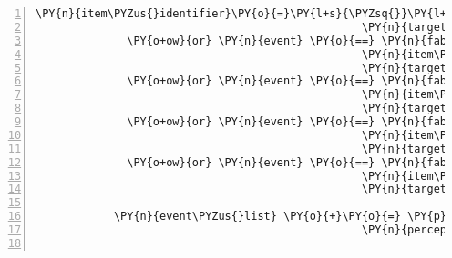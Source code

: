 \begin{Verbatim}[commandchars=\\\{\},numbers=left,firstnumber=1,stepnumber=1]
                                                  \PY{n}{item\PYZus{}identifier}\PY{o}{=}\PY{l+s}{\PYZsq{}}\PY{l+s}{lute\PYZus{}broken}\PY{l+s}{\PYZsq{}}\PY{p}{,}
                                                  \PY{n}{target\PYZus{}identifier}\PY{o}{=}\PY{l+s}{\PYZsq{}}\PY{l+s}{teleport\PYZus{}room\PYZus{}kuni}\PY{l+s}{\PYZsq{}}\PY{p}{)}
              \PY{o+ow}{or} \PY{n}{event} \PY{o}{==} \PY{n}{fabula}\PY{o}{.}\PY{n}{TriesToDropEvent}\PY{p}{(}\PY{n}{identifier}\PY{o}{=}\PY{n}{ID\PYZus{}CASSANDRA}\PY{p}{,}
                                                  \PY{n}{item\PYZus{}identifier}\PY{o}{=}\PY{l+s}{\PYZsq{}}\PY{l+s}{lute\PYZus{}broken}\PY{l+s}{\PYZsq{}}\PY{p}{,}
                                                  \PY{n}{target\PYZus{}identifier}\PY{o}{=}\PY{l+s}{\PYZsq{}}\PY{l+s}{teleport\PYZus{}room\PYZus{}cassandra}\PY{l+s}{\PYZsq{}}\PY{p}{)}
              \PY{o+ow}{or} \PY{n}{event} \PY{o}{==} \PY{n}{fabula}\PY{o}{.}\PY{n}{TriesToDropEvent}\PY{p}{(}\PY{n}{identifier}\PY{o}{=}\PY{n}{ID\PYZus{}CASSANDRA}\PY{p}{,}
                                                  \PY{n}{item\PYZus{}identifier}\PY{o}{=}\PY{l+s}{\PYZsq{}}\PY{l+s}{lute\PYZus{}broken}\PY{l+s}{\PYZsq{}}\PY{p}{,}
                                                  \PY{n}{target\PYZus{}identifier}\PY{o}{=}\PY{l+s}{\PYZsq{}}\PY{l+s}{teleport\PYZus{}room\PYZus{}kuni}\PY{l+s}{\PYZsq{}}\PY{p}{)}
              \PY{o+ow}{or} \PY{n}{event} \PY{o}{==} \PY{n}{fabula}\PY{o}{.}\PY{n}{TriesToDropEvent}\PY{p}{(}\PY{n}{identifier}\PY{o}{=}\PY{n}{ID\PYZus{}CASSANDRA}\PY{p}{,}
                                                  \PY{n}{item\PYZus{}identifier}\PY{o}{=}\PY{l+s}{\PYZsq{}}\PY{l+s}{lute}\PY{l+s}{\PYZsq{}}\PY{p}{,}
                                                  \PY{n}{target\PYZus{}identifier}\PY{o}{=}\PY{l+s}{\PYZsq{}}\PY{l+s}{teleport\PYZus{}room\PYZus{}kuni}\PY{l+s}{\PYZsq{}}\PY{p}{)}
              \PY{o+ow}{or} \PY{n}{event} \PY{o}{==} \PY{n}{fabula}\PY{o}{.}\PY{n}{TriesToDropEvent}\PY{p}{(}\PY{n}{identifier}\PY{o}{=}\PY{n}{ID\PYZus{}CASSANDRA}\PY{p}{,}
                                                  \PY{n}{item\PYZus{}identifier}\PY{o}{=}\PY{l+s}{\PYZsq{}}\PY{l+s}{lute}\PY{l+s}{\PYZsq{}}\PY{p}{,}
                                                  \PY{n}{target\PYZus{}identifier}\PY{o}{=}\PY{l+s}{\PYZsq{}}\PY{l+s}{teleport\PYZus{}room\PYZus{}cassandra}\PY{l+s}{\PYZsq{}}\PY{p}{)}\PY{p}{)}\PY{p}{:}

            \PY{n}{event\PYZus{}list} \PY{o}{+}\PY{o}{=} \PY{p}{[}\PY{n}{fabula}\PY{o}{.}\PY{n}{PerceptionEvent}\PY{p}{(}\PY{n}{identifier}\PY{o}{=}\PY{n}{ID\PYZus{}CASSANDRA}\PY{p}{,}
                                                  \PY{n}{perception}\PY{o}{=}\PY{l+s}{\PYZsq{}}\PY{l+s}{Das möchte ich hier nicht ablegen.}\PY{l+s}{\PYZsq{}}\PY{p}{)}\PY{p}{]}


\end{Verbatim}
